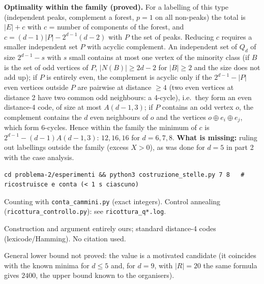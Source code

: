 \textbf{Optimality within the family (proved).} For a labelling of this
type (independent peaks, complement a forest, \(p=1\) on all non-peaks)
the total is \(|E|+c\) with \(c\) = number of components of the forest,
and \(c=(d-1)|P|-2^{d-1}(d-2)\) with \(P\) the set of peaks. Reducing
\(c\) requires a smaller independent set \(P\) with acyclic complement.
An independent set of \(Q_d\) of size \(2^{d-1}-s\) with \(s\) small
contains at most one vertex of the minority class (if \(B\) is the set
of odd vertices of \(P\), \(|N(B)|\ge 2d-2\) for \(|B|\ge2\) and the
size does not add up); if \(P\) is entirely even, the complement is
acyclic only if the \(2^{d-1}-|P|\) even vertices outside \(P\) are
pairwise at distance \(\ge4\) (two even vertices at distance 2 have two
common odd neighbours: a 4-cycle), i.e.~they form an even distance-4
code, of size at most \(A(d-1,3)\); if \(P\) contains an odd vertex
\(o\), the complement contains the \(d\) even neighbours of \(o\) and
the vertices \(o\oplus e_i\oplus e_j\), which form 6-cycles. Hence
within the family the minimum of \(c\) is \(2^{d-1}-(d-1)A(d-1,3)\):
\(12,16,16\) for \(d=6,7,8\). \textbf{What is missing:} ruling out
labellings outside the family (excess \(X>0\)), as was done for \(d=5\)
in part 2 with the case analysis.


\begin{verbatim}
cd problema-2/esperimenti && python3 costruzione_stelle.py 7 8   # ricostruisce e conta (< 1 s ciascuno)
\end{verbatim}

Counting with \texttt{conta\_cammini.py} (exact integers). Control
annealing (\texttt{ricottura\_controllo.py}): see
\texttt{ricottura\_q*.log}.


Construction and argument entirely ours; standard distance-4 codes
(lexicode/Hamming). No citation used.


General lower bound not proved: the value is a motivated candidate (it
coincides with the known minima for \(d\le5\) and, for \(d=9\), with
\(|R|=20\) the same formula gives \(2400\), the upper bound known to the
organisers).

